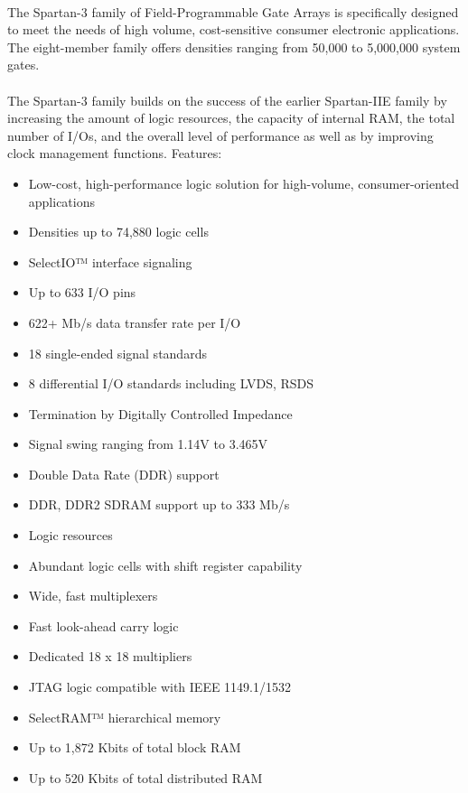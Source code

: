 \documentclass[14pt]{report}
\begin{document}
{\paragraph{} The Spartan-3 family of Field-Programmable Gate Arrays
is specifically designed to meet the needs of high volume,
cost-sensitive consumer electronic applications. The
eight-member family offers densities ranging from 50,000 to
5,000,000 system gates.
\paragraph{} The Spartan-3 family builds on the success of the earlier
Spartan-IIE family by increasing the amount of logic
resources, the capacity of internal RAM, the total number of
I/Os, and the overall level of performance as well as by
improving clock management functions.
Features:
\begin{itemize}
\item Low-cost, high-performance logic solution for high-volume,
consumer-oriented applications
\item  Densities up to 74,880 logic cells
\item SelectIO™ interface signaling
\item Up to 633 I/O pins
\item 622+ Mb/s data transfer rate per I/O
\item 18 single-ended signal standards
\item 8 differential I/O standards including LVDS, RSDS
\item Termination by Digitally Controlled Impedance
\item Signal swing ranging from 1.14V to 3.465V
\item Double Data Rate (DDR) support
\item DDR, DDR2 SDRAM support up to 333 Mb/s
\item Logic resources
\item Abundant logic cells with shift register capability
\item Wide, fast multiplexers
\item Fast look-ahead carry logic
\item Dedicated 18 x 18 multipliers
\item JTAG logic compatible with IEEE 1149.1/1532
\item SelectRAM™ hierarchical memory
\item Up to 1,872 Kbits of total block RAM
\item Up to 520 Kbits of total distributed RAM

\end{itemize}}
\end{document}
